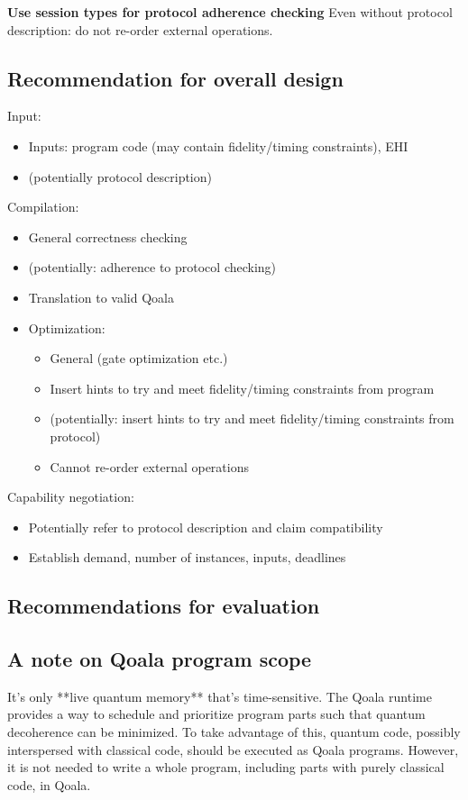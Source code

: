 \textbf{Use session types for protocol adherence checking}
Even without protocol description: do not re-order external operations.



\subsection{Recommendation for overall design}

Input:
\begin{itemize}
  \item Inputs: program code (may contain fidelity/timing constraints), EHI
  \item (potentially protocol description)
\end{itemize}

Compilation:
\begin{itemize}
  \item General correctness checking
  \item (potentially: adherence to protocol checking)
  \item Translation to valid Qoala
  \item Optimization:
    \begin{itemize}
      \item General (gate optimization etc.)
      \item Insert hints to try and meet fidelity/timing constraints from program
      \item (potentially: insert hints to try and meet fidelity/timing constraints from protocol)
      \item Cannot re-order external operations
    \end{itemize}
\end{itemize}

Capability negotiation:
\begin{itemize}
  \item Potentially refer to protocol description and claim compatibility
  \item Establish demand, number of instances, inputs, deadlines
\end{itemize}


\subsection{Recommendations for evaluation}



\subsection{A note on Qoala program scope}
It's only **live quantum memory** that's time-sensitive.
The Qoala runtime provides a way to schedule and prioritize program parts such that quantum decoherence can be minimized.
To take advantage of this, quantum code, possibly interspersed with classical code, should be executed as Qoala programs.
However, it is not needed to write a whole program, including parts with purely classical code, in Qoala.